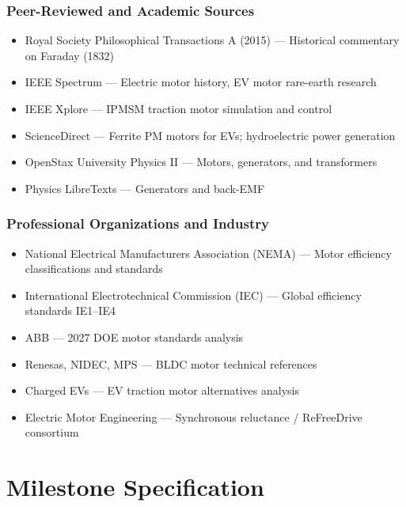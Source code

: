 \documentclass[11pt,letterpaper]{article}
\newcommand{\stageheader}[2]{%
  \noindent\colorbox{#2}{\makebox[\textwidth][l]{%
    \textcolor{white}{\bfseries\sffamily\hspace{6pt}#1\hspace{6pt}}}}%
  \vspace{0.5em}\par%
}
\begin{document}
\subsubsection{Peer-Reviewed and Academic Sources}
\begin{itemize}[leftmargin=2em]
\item Royal Society Philosophical Transactions A (2015) --- Historical commentary on Faraday (1832)
\item IEEE Spectrum --- Electric motor history, EV motor rare-earth research
\item IEEE Xplore --- IPMSM traction motor simulation and control
\item ScienceDirect --- Ferrite PM motors for EVs; hydroelectric power generation
\item OpenStax University Physics II --- Motors, generators, and transformers
\item Physics LibreTexts --- Generators and back-EMF
\end{itemize}

\subsubsection{Professional Organizations and Industry}
\begin{itemize}[leftmargin=2em]
\item National Electrical Manufacturers Association (NEMA) --- Motor efficiency classifications and standards
\item International Electrotechnical Commission (IEC) --- Global efficiency standards IE1--IE4
\item ABB --- 2027 DOE motor standards analysis
\item Renesas, NIDEC, MPS --- BLDC motor technical references
\item Charged EVs --- EV traction motor alternatives analysis
\item Electric Motor Engineering --- Synchronous reluctance / ReFreeDrive consortium
\end{itemize}

\newpage

\stageheader{STAGE 3 --- MISSION PACKAGE}{tertiary}

\section{Milestone Specification}
\end{document}
